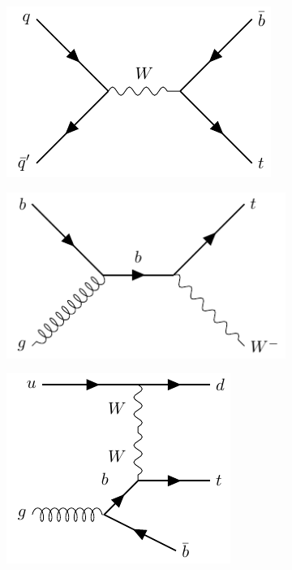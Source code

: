 \begin{figure}[h!] 
  \begin{subfigure}[b]{0.33\linewidth}
    \centering
    \includegraphics[width=0.96\linewidth]{ubonn-thesis/Chapters/Chapters_02/Figure/singletop_s-channel.pdf} 
  \caption{}
  \end{subfigure}%
  \begin{subfigure}[b]{0.33\linewidth}
    \centering
    \includegraphics[width=\linewidth]{ubonn-thesis/Chapters/Chapters_02/Figure/singletop_realW.pdf} 
  \caption{}
  \end{subfigure} 
  \begin{subfigure}[b]{0.33\linewidth}
    \centering
    \includegraphics[width=0.76\linewidth]{ubonn-thesis/Chapters/Chapters_02/Figure/tchannel_4FS.pdf} 

\end{subfigure}
\end{figure}
